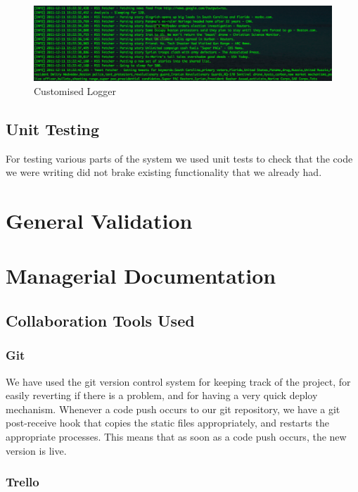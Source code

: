 \documentclass[a4paper,12pt]{article}
\begin{document}
	  \begin{figure}[ht!]
				  \centering
					  \includegraphics[scale=0.4]{logger.png}
				    \caption{Customised Logger}
	  \end{figure}
	
	  \subsection{Unit Testing}
	
	For testing various parts of the system we used unit tests to check that the code we were writing did not brake existing functionality that we already had.
	
	\section{General Validation}
	
	\section{Managerial Documentation}
	
		\subsection{Collaboration Tools Used}
		
			\subsubsection{Git}
			
			We have used the git version control system for keeping track of the project, for easily reverting if there is a problem, and for having a very quick deploy mechanism. Whenever a code push occurs to our git repository, we have a git post-receive hook that copies the static files appropriately, and restarts the appropriate processes. This means that as soon as a code push occurs, the new version is live.
			
			\subsubsection{Trello}
			
\end{document}

